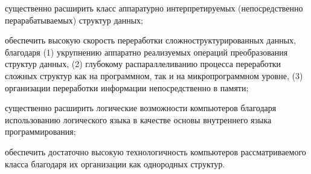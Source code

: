 \begin{SCn}
\begin{scnsubstruct}
{            \begin{scnitemize}
                \item существенно расширить класс аппаратурно интерпретируемых (непосредственно перарабатываемых) структур данных;
                \item обеспечить высокую скорость переработки сложноструктурированных данных, благодаря (1) укрупнению аппаратно реализуемых операций преобразования структур данных, (2) глубокому распараллеливанию процесса переработки сложных структур как на программном, так и на микропрограммном уровне, (3) организации переработки информации непосредственно в памяти;
                \item существенно расширить логические возможности компьютеров благодаря использованию логического языка в качестве основы внутреннего языка программирования;
                \item обеспечить достаточно высокую технологичность компьютеров рассматриваемого класса благодаря их организации как однородных структур.
            \end{scnitemize}
        }
        \bigskip
    \end{scnsubstruct}
    \scnendcurrentsectioncomment
\end{SCn}
